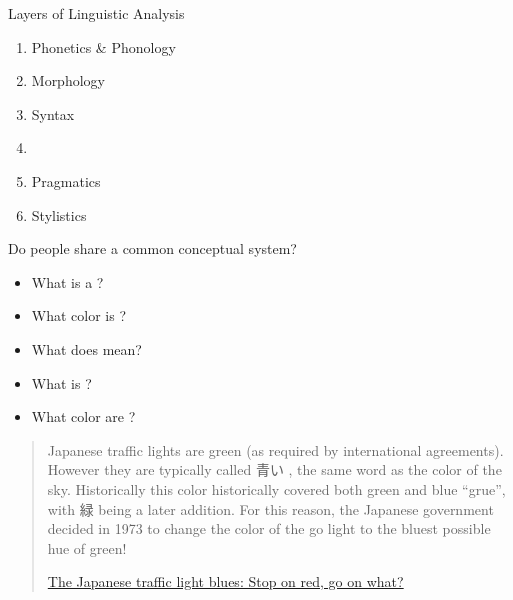 \documentclass{beamer}
\begin{document}
\begin{frame}{Layers of Linguistic Analysis}
\begin{enumerate}\addtolength{\itemsep}{-0.75ex}
\item Phonetics \& Phonology
\item Morphology
\item Syntax
\item {}
\item Pragmatics
\item Stylistics
\end{enumerate}
\end{frame}

\begin{frame}{Do people share a common conceptual system?}

\begin{itemize}
\item What is a ?
\item What color is ?
\item What does  mean?
\item What is  ?
\item What color are ?
\end{itemize}

\newpage

\begin{quotation}
  
Japanese traffic lights are green (as required by international
agreements).  However they are typically called 青い ,
the same word as the color of the sky.  Historically this color
historically covered both green and blue ``grue'',
with 緑  being a later addition.  For this reason,
the Japanese government decided in 1973 to change the color of the go
light to the bluest possible hue of green!


\hfill \href{https://www.japantimes.co.jp/life/2013/02/25/language/the-japanese-traffic-light-blues-stop-on-red-go-on-what/}{The Japanese traffic light blues: Stop on red, go on what?}
\end{quotation} 
\end{frame}
\end{document}
